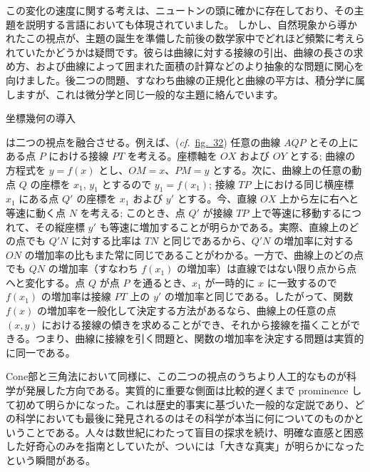 \documentclass[a4paper,11pt,openany]{ltjsbook}
\providecommand{\Chg}[2]{#2}
\providecommand{\Fig}[2][Fig.]{\hyperref[fig:#2]{#1~#2}}
\providecommand{\cf}{\emph{cf.}}
\providecommand{\Typo}[2]{#2}
\begin{document}
この変化の速度に関する考えは、ニュートンの頭に確かに存在しており、その主題を説明する言語においても体現されていました。
しかし、自然現象から導かれたこの視点が、主題の誕生を準備した前後の数学家中でどれほど頻繁に考えられていたかどうかは疑問です。彼らは曲線に対する接線の引出、曲線の長さの求め方、および曲線によって囲まれた面積の計算などのより抽象的な問題に関心を向けました。後二つの問題、すなわち曲線の正規化と曲線の平方は、積分学に属しますが、これは微分学と同じ一般的な主題に絡んでいます。

坐標幾何の導入

は二つの視点を融合させる。例えば、(\Chg{cf.}{\cf}\ \Fig[fig.]{32}) 任意の曲線 $AQP$ とその上にある点 $P$ における接線 $PT$ を考える。座標軸を $OX$ および $OY$ とする; 曲線の方程式を $y = f(x)$ とし、$OM = x$、$PM = y$ とする。次に、曲線上の任意の動点 $Q$ の座標を $x_{1}$, $y_{1}$ とするので $y_{1} = f(x_{1})$; 接線 $TP$ 上における同じ横座標 $x_{1}$ にある点 $Q'$ の座標を $x_{1}$ および $y'$ とする。今、直線 $OX$ 上から左に右へと等速に動く点 $N$ を考える; このとき、点 $Q'$ が接線 $TP$ 上で等速に移動するにつれて、その縦座標 $y'$ も等速に増加することが明らかである。実際、直線上のどの点でも $Q'N$ に対する比率は $TN$ と同じであるから、$Q'N$ の増加率に対する $ON$ の増加率の比もまた常に同じであることがわかる。一方で、曲線上のどの点でも $QN$ の増加率（すなわち $f(x_{1})$ の増加率）は直線ではない限り点から点へと変化する。点 $Q$ が点 $P$ を通るとき、$x_{1}$ が一時的に $x$ に一致するので $f(x_{1})$ の増加率は接線 $PT$ 上の $y'$ の増加率と同じである。したがって、関数 $f(x)$ の増加率を一般化して決定する方法があるなら、曲線上の任意の点 $(x, y\Typo{,}{})$ における接線の傾きを求めることができ、それから接線を描くことができる。つまり、曲線に接線を引く問題と、関数の増加率を決定する問題は実質的に同一である。

Cone部と三角法において同様に、この二つの視点のうちより人工的なものが科学が発展した方向である。実質的に重要な側面は比較的遅くまで prominence して初めて明らかになった。これは歴史的事実に基づいた一般的な定説であり、どの科学においても最後に発見されるのはその科学が本当に何についてのものかということである。人々は数世紀にわたって盲目の探求を続け、明確な直感と困惑した好奇心のみを指南としていたが、ついには「大きな真実」が明らかになったという瞬間がある。
\end{document}
